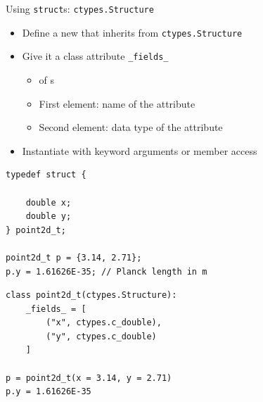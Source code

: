 
\begin{frame}[fragile]{Using \texttt{struct}s: \texttt{ctypes.Structure}}
%
\begin{itemize}
\item Define a new  that inherits from \texttt{ctypes.Structure}
\item Give it a class attribute \texttt{\_fields\_}
	\begin{itemize}
	\item {} of s
	\item First  element: name of the attribute
	\item Second  element: data type of the attribute
	\end{itemize}
\item Instantiate with keyword arguments or member access
\end{itemize}
%
\begin{tcbraster}[raster columns=2,
                  raster equal height,
                  nobeforeafter,
                  raster column skip=0.2cm]
\begin{codebox}[C struct]
\begin{verbatim}
typedef struct {

    double x;
    double y;
} point2d_t;

point2d_t p = {3.14, 2.71};
p.y = 1.61626E-35; // Planck length in m
\end{verbatim}
\end{codebox}
%
%
\begin{codebox}
\begin{verbatim}
class point2d_t(ctypes.Structure):
    _fields_ = [
        ("x", ctypes.c_double),
        ("y", ctypes.c_double)
    ]

p = point2d_t(x = 3.14, y = 2.71)
p.y = 1.61626E-35
\end{verbatim}
\end{codebox}
\end{tcbraster}
%
\end{frame}


